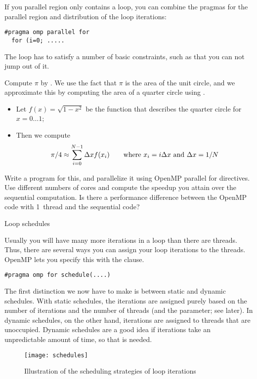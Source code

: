 If you parallel region only contains a loop, you can combine the
pragmas for the parallel region and distribution of the loop iterations:
\begin{verbatim}
#pragma omp parallel for
  for (i=0; .....
\end{verbatim}

The loop has to satisfy a number of basic constraints, such as that you can not
jump out of it.

\begin{exercise}
  \label{ex:omp-pi}
  Compute $\pi$ by . We use the fact that $\pi$
  is the area of the unit circle, and we approximate this by computing
  the area of a quarter circle using .
  \begin{itemize}
  \item Let $f(x)=\sqrt{1-x^2}$ be the function that describes the
    quarter circle for $x=0\ldots 1$;
  \item Then we compute \[ \pi/4\approx\sum_{i=0}^{N-1} \Delta x
    f(x_i) \qquad \hbox{where $x_i=i\Delta x$ and $\Delta x=1/N$} \]
  \end{itemize}
  Write a program for this, and parallelize it using OpenMP parallel
  for directives. Use different numbers of cores and compute the
  speedup you attain over the sequential computation. Is there a
  performance difference between the OpenMP code with 1~thread and the
  sequential code?
\end{exercise}

 {Loop schedules}

Usually you will have many more iterations in a loop than there are threads.
Thus, there are several ways you can assign your loop iterations to the threads.
OpenMP lets you specify this with the  clause.
\begin{verbatim}
#pragma omp for schedule(....)
\end{verbatim}

The first distinction we now have to make is between static and dynamic schedules.
With static schedules, the iterations are assigned purely based on the number
of iterations and the number of threads (and the  parameter; see later).
In dynamic schedules, on the other hand, iterations are assigned to threads that
are unoccupied. Dynamic schedules are a good idea if iterations take an unpredictable
amount of time, so that  is needed.

\begin{figure}[ht]
  \texttt{[image: schedules]}
  \caption{Illustration of the scheduling strategies of loop iterations}
  \label{fig:omp-schedule}
\end{figure}

